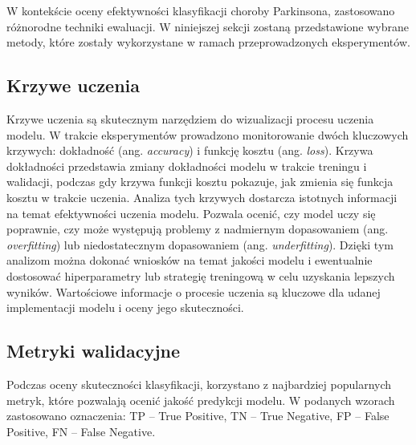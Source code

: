 W kontekście oceny efektywności klasyfikacji choroby Parkinsona, zastosowano różnorodne techniki ewaluacji.
W niniejszej sekcji zostaną przedstawione wybrane metody, które zostały wykorzystane w ramach przeprowadzonych eksperymentów.

\subsection{Krzywe uczenia}
\label{subsec:krzywe-uczenia}

Krzywe uczenia są skutecznym narzędziem do wizualizacji procesu uczenia modelu.
W trakcie eksperymentów prowadzono monitorowanie dwóch kluczowych krzywych: dokładność (ang. \emph{accuracy}) i funkcję kosztu (ang. \emph{loss}).
Krzywa dokładności przedstawia zmiany dokładności modelu w trakcie treningu i walidacji, podczas gdy krzywa funkcji kosztu pokazuje, jak zmienia się funkcja kosztu w trakcie uczenia.
Analiza tych krzywych dostarcza istotnych informacji na temat efektywności uczenia modelu. Pozwala ocenić, czy model uczy się poprawnie, czy może występują problemy z
nadmiernym dopasowaniem  (ang. \emph{overfitting}) lub niedostatecznym dopasowaniem (ang. \emph{underfitting}).
Dzięki tym analizom można dokonać wniosków na temat jakości modelu i ewentualnie dostosować hiperparametry lub strategię treningową w celu uzyskania lepszych wyników.
Wartościowe informacje o procesie uczenia są kluczowe dla udanej implementacji modelu i oceny jego skuteczności.

\subsection{Metryki walidacyjne}
\label{subsec:metryki-waldiacyjne}

Podczas oceny skuteczności klasyfikacji, korzystano z najbardziej popularnych metryk, które pozwalają ocenić jakość predykcji modelu.
W podanych wzorach zastosowano oznaczenia:  TP – True Positive, TN – True Negative, FP – False Positive, FN – False Negative.

